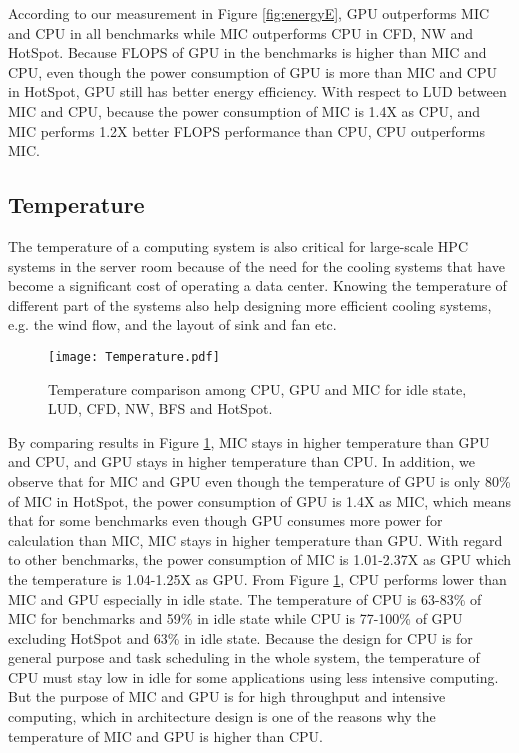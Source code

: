 According to our measurement in Figure \ref{fig:energyE}, GPU outperforms MIC and CPU in all benchmarks while MIC outperforms CPU in CFD, NW and HotSpot. Because FLOPS of GPU in the benchmarks is higher than MIC and CPU, even though the power consumption of GPU is more than MIC and CPU in HotSpot, GPU still has better energy efficiency. With respect to LUD between MIC and CPU, because the power consumption of MIC is 1.4X as CPU, and MIC performs 1.2X better FLOPS performance than CPU, CPU outperforms MIC.


\subsection{Temperature}

The temperature of a computing system is also critical for large-scale HPC systems in the server room 
because of the need for the cooling systems that have become a significant cost of operating a data center. Knowing the
temperature of different part of the systems also help designing more efficient cooling systems, e.g. 
the wind flow, and the layout of sink and fan etc. 

    \begin{figure}[h!]
  \centering
  \begin{minipage}{0.5\textwidth}
    \centering
   \centering
     \texttt{[image: Temperature.pdf]}    
\caption{Temperature comparison among CPU, GPU and MIC for idle state, LUD, CFD, NW, BFS and HotSpot.}
\label{fig:temperature}
\end{minipage}%
\end{figure}

By comparing results in Figure \ref{fig:temperature}, MIC stays in higher temperature than GPU and CPU, and GPU stays in higher temperature than CPU. In addition, we observe that for MIC and GPU even though the temperature of GPU is only 80\% of MIC in HotSpot, the power consumption of GPU is 1.4X as MIC, which means that for some benchmarks even though GPU consumes more power for calculation than MIC, MIC stays in higher temperature than GPU. With regard to other benchmarks, the power consumption of MIC is 1.01-2.37X as GPU which the temperature is 1.04-1.25X as GPU. From Figure \ref{fig:temperature}, CPU performs lower than MIC and GPU especially in idle state. The temperature of CPU is 63-83\% of MIC for benchmarks and 59\% in idle state while CPU is 77-100\% of GPU excluding HotSpot and 63\% in idle state. Because the design for CPU is for general purpose and task scheduling in the whole system, the temperature of CPU must stay low in idle for some applications using less intensive computing. But the purpose of MIC and GPU is for high throughput and intensive computing, which in architecture design is one of the reasons why the temperature of MIC and GPU is higher than CPU.




